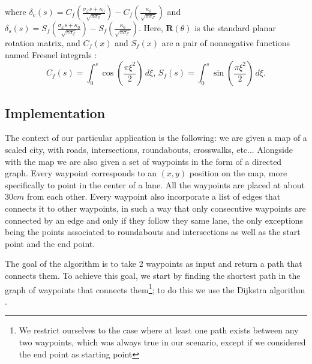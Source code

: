 \documentclass[a4paper,12pt,sort&compress]{article}
\begin{document}
    where $\delta _c(s) = C_f (\frac{\sigma _{{\mathcal {E}}}s+\kappa_0}{\sqrt{\pi \sigma
    _{{\mathcal {E}}}}}) - C_f (\frac{\kappa_0}{\sqrt{\pi \sigma _{{\mathcal {E}}}}})$ and
    $\delta_s(s) = S_f (\frac{\sigma _{{\mathcal {E}}}s+\kappa_0}{\sqrt{\pi \sigma
    _{{\mathcal {E}}}}}) - S_f (\frac{\kappa_0}{\sqrt{\pi \sigma _{{\mathcal {E}}}}})$. Here,
    $\mathbf {R}(\theta)$ is the standard planar rotation matrix, and $C_f(x)$ and $S_f(x)$ are a
    pair of nonnegative functions named Fresnel integrals \citep*{41470}:
    \begin{equation} \label{eq:clothoid}
        C_f(s)=\int _0^s \cos 
        \left(
            \frac{\pi \xi ^2}{2}
        \right) 
        \, 
        d\xi, \, S_f(s)=\int _0^s \sin 
        \left(
            \frac{\pi \xi ^2}{2}
        \right) 
        \, 
        d\xi . 
    \end{equation}

    \subsection{Implementation}

    The context of our particular application is the following: we are given a map of a scaled city,
    with roads, intersections, roundabouts, crosswalks, etc... Alongside with the map we are also given
    a set of waypoints in the form of a directed graph. Every waypoint corresponds to an $(x,y)$ position on
    the map, more specifically to point in the center of a lane. All the waypoints are placed at
    about $30 cm$ from each other. Every waypoint also incorporate a list of edges that
    connects it to other waypoints, in such a way that only consecutive waypoints are connected by an
    edge and only if they follow they same lane, the only exceptions being the points associated to
    roundabouts and intersections as well as the start point and the end point. 
    
    The goal of the algorithm is to take 2 waypoints as input and return a path that connects them.
    To achieve this goal, we start by finding the shortest path in the graph of waypoints that
    connects them\footnote{We restrict ourselves to the case where at least one path exists between
    any two waypoints, which was always true in our scenario, except if we considered the end point as
    starting point}; to do this we use the Dijkstra algorithm \citep*{dijkstra1959note}. 
    
\end{document}
